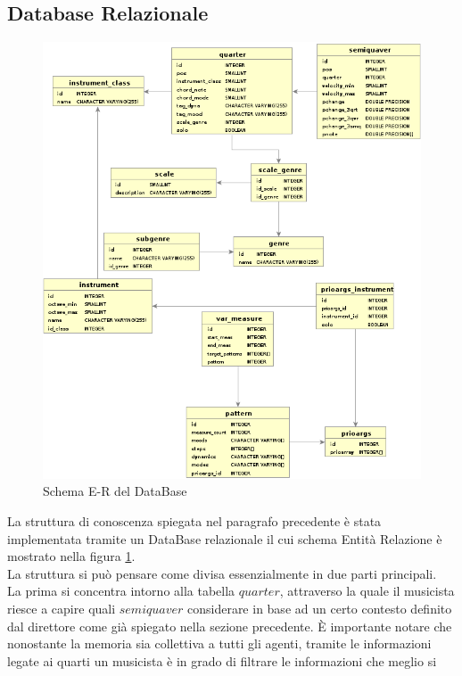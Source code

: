 \subsection{Database Relazionale}
\label{database}
\begin{figure}[H]
\centering
\includegraphics[scale=0.7]{img/db.png}
\caption{Schema E-R del DataBase}
\label{figure-db}
\end{figure}
La struttura di conoscenza spiegata nel paragrafo precedente è stata implementata
tramite un DataBase relazionale il cui schema Entità Relazione è mostrato nella figura
\ref{figure-db}.\\
La struttura si può pensare come divisa essenzialmente in due parti principali.\\ 
La prima si concentra intorno alla tabella $quarter$, attraverso la quale il musicista
riesce a capire quali $semiquaver$ considerare in base ad un certo contesto definito
dal direttore come già spiegato nella sezione precedente. È importante notare che 
nonostante la memoria sia collettiva a tutti gli agenti, tramite le informazioni 
legate ai quarti un musicista è in grado di filtrare le informazioni che meglio si
